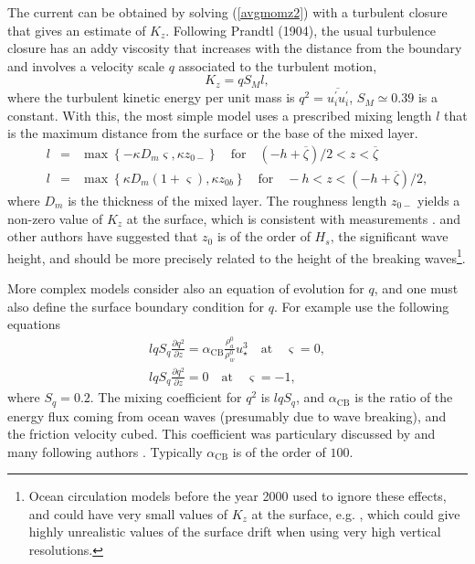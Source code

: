 The current can be obtained by solving  (\ref{avgmomz2}) with a turbulent closure that gives an estimate of  $K_z$. 
Following Prandtl (1904), the usual turbulence closure has an addy viscosity that increases with the distance from the boundary 
\citep{Schlichting1979} and involves a velocity scale $q$ associated to the turbulent motion, 
\begin{equation}
K_z = q S_M l,
\end{equation}
where the turbulent kinetic energy per unit mass is  $q^2 = \overline{u^\prime_i u^\prime_i}$, $S_M \simeq 0.39$ is a constant. 
With this, the  most simple model uses a prescribed mixing length $l$ that is the maximum distance from the surface or the base of the mixed layer. 
\begin{eqnarray}
l &= &\max\left\{-\kappa D_m \varsigma, \kappa  z_{0-}\right\} \quad
\textrm{for}
\quad (-h+\overline{\zeta})/2 < z < \overline{\zeta} \nonumber\\
l &= &\max\left\{\kappa D_m (1+\varsigma), \kappa z_{0b}\right\} \quad
\textrm{for} \quad   -h < z  <(-h+\overline{\zeta})/2 ,
\end{eqnarray}
where $D_m$ is the thickness of the mixed layer. The roughness length  $z_{0-}$ yields a non-zero value of  $K_z$ at the surface, 
  which is consistent with measurements \citep[e.g.][]{Kitaigorodskii1994}. \cite{Thorpe&al.2003a} 
  and other authors have suggested that $z_0$ is of the order of  $H_s$, the significant wave height, and should be more precisely related to the height of the breaking waves\footnote{Ocean circulation models before the year 2000 
  used to ignore these effects, and could have very small values of $K_z$ at the surface, e.g. \citet{Large&al.1994}, 
which could give highly unrealistic values of the surface drift when using very high vertical resolutions.}. 

More complex models consider also an equation of evolution for $q$,  and one must also define the surface boundary
condition for $q$. For example  \cite{Mellor&Yamada1982} use the following equations
\begin{eqnarray}
l q S_q \frac{\partial q^2}{\partial z}  =  \alpha_{\mathrm{CB}} \frac{\rho_a^0}{\rho_w^0}
u_\star^3  \quad \textrm{at} \quad \varsigma =
0, \label{surfq} \\
l q S_q \frac{\partial q^2}{\partial z}  =0 \quad \textrm{at} \quad \varsigma =
-1,
\end{eqnarray}
where $S_q=0.2$. The mixing coefficient for $q^2$ is  $l q S_q$, and 
$\alpha_{\mathrm{CB}}$ is the ratio of the energy flux coming from ocean waves (presumably due to wave breaking), and the friction velocity cubed. 
This coefficient was particulary discussed by \cite{Craig&Banner1994} and many following authors 
\citep{Terray&al.2000,Mellor&Blumberg2004,Rascle&Ardhuin2009,Rascle&Ardhuin2013}. 
Typically $\alpha_{\mathrm{CB}}$ is of the order of  $100$.

